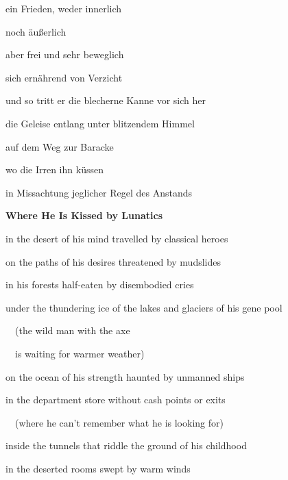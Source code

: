 ein Frieden, weder innerlich 

noch äußerlich

aber frei und sehr beweglich

sich ernährend von Verzicht


\bigskip


\bigskip


\bigskip

und so tritt er die blecherne Kanne vor sich her

die Geleise entlang unter blitzendem Himmel

auf dem Weg zur Baracke


\bigskip

wo die Irren ihn küssen

in Missachtung jeglicher Regel des Anstands


\bigskip

\clearpage
\bigskip

{\bfseries
Where He Is Kissed by Lunatics}


\bigskip


\bigskip

in the desert of his mind travelled by classical heroes


\bigskip

on the paths of his desires threatened by mudslides


\bigskip

in his forests half-eaten by disembodied cries


\bigskip

under the thundering ice of the lakes and glaciers of his gene pool


\bigskip

\ \  (the wild man with the axe

\ \  is waiting for warmer weather)


\bigskip

on the ocean of his strength haunted by unmanned ships


\bigskip

in the department store without cash points or exits


\bigskip

\ \  (where he can't remember what he is looking for)


\bigskip

inside the tunnels that riddle the ground of his childhood 


\bigskip

in the deserted rooms swept by warm winds


